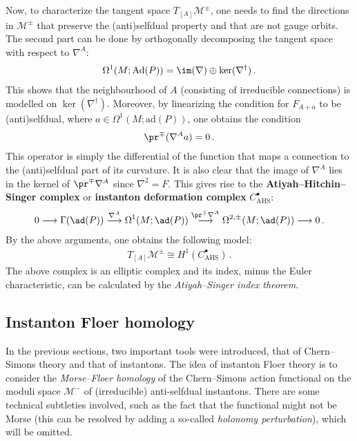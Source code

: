     Now, to characterize the tangent space $T_{[A]}\mathcal{M}^\pm$, one needs to find the directions in $\mathcal{M}^\pm$ that preserve the (anti)selfdual property and that are not gauge orbits. The second part can be done by orthogonally decomposing the tangent space with respect to $\nabla^A$:
    \begin{gather}
        \Omega^1(M;\mathrm{Ad}(P))=\im(\nabla)\oplus\ker(\nabla^\dagger)\,.
    \end{gather}
    This shows that the neighbourhood of $A$ (consisting of irreducible connections) is modelled on $\ker(\nabla^\dagger)$. Moreover, by linearizing the condition for $F_{A+a}$ to be (anti)selfdual, where $a\in\Omega^1(M;\mathrm{ad}(P))$, one obtains the condition
    \begin{gather}
        \pr^\mp(\nabla^Aa)=0\,.
    \end{gather}
    This operator is simply the differential of the function that maps a connection to the (anti)selfdual part of its curvature. It is also clear that the image of $\nabla^A$ lies in the kernel of $\pr^\mp\nabla^A$ since $\nabla^2=F$. This gives rise to the \textbf{Atiyah--Hitchin--Singer complex} or \textbf{instanton deformation complex} $C^\bullet_{\text{AHS}}$:
    \begin{gather}
        0\longrightarrow\Gamma(\ad(P))\overset{\nabla^A}{\longrightarrow}\Omega^1(M;\ad(P))\overset{\pr^\mp\nabla^A}{\longrightarrow}\Omega^{2,\pm}(M;\ad(P))\longrightarrow0\,.
    \end{gather}
    By the above arguments, one obtains the following model:
    \begin{gather}
        T_{[A]}\mathcal{M}^\pm\cong H^1(C^\bullet_{\text{AHS}})\,.
    \end{gather}
    The above complex is an elliptic complex and its index, minus the Euler characteristic, can be calculated by the \textit{Atiyah--Singer index theorem}.


\subsection{Instanton Floer homology}

    In the previous sections, two important tools were introduced, that of Chern--Simons theory and that of instantons. The idea of instanton Floer theory is to consider the \textit{Morse--Floer homology} of the Chern--Simons action functional on the moduli space $\mathcal{M}^-$ of (irreducible) anti-selfdual instantons. There are some technical subtleties involved, such as the fact that the functional might not be Morse (this can be resolved by adding a so-called \textit{holonomy perturbation}), which will be omitted.

